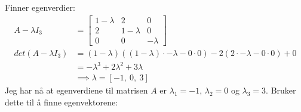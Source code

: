 \documentclass[11pt, a4paper, norsk]{NTNUoving}
\begin{document}
\begin{oppgave}
\begin{punkt}
            Finner egenverdier:
            \begin{align*}
                A - \lambda I_{3} &= \begin{bmatrix}
                    1 - \lambda & 2 & 0 \\
                    2 & 1 - \lambda & 0 \\
                    0 & 0 & -\lambda
                \end{bmatrix}
                \\
                    det(A - \lambda I_{3}) &= (1-\lambda)((1-\lambda) \cdot -\lambda- 0 \cdot 0) - 2(2 \cdot -\lambda - 0 \cdot 0) + 0 \\
                                          &= -\lambda^3 + 2\lambda^2 + 3\lambda
                                          \\
                                          &\implies \lambda = \left[ -1, \  0, \  3\right]
            \end{align*}
            Jeg har nå at egenverdiene til matrisen $A$ er $\lambda_1 = -1$, $\lambda_2 = 0$ og $\lambda_3 = 3$. Bruker dette til å finne egenvektorene:
            

\end{punkt}
\end{oppgave}
\end{document}
